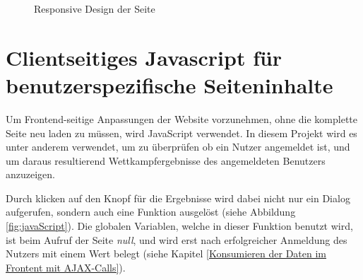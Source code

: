 \begin{figure}[!h]
	\caption{Responsive Design der Seite}
	\label{fig:responsive}
\end{figure}

\section{Clientseitiges Javascript für benutzerspezifische Seiteninhalte}
\label{Clientseitiges Javascript}
Um Frontend-seitige Anpassungen der Website vorzunehmen, ohne die komplette Seite neu laden zu müssen, wird JavaScript verwendet. In diesem Projekt wird es unter anderem verwendet, um zu überprüfen ob ein Nutzer angemeldet ist, und um daraus resultierend Wettkampfergebnisse des angemeldeten Benutzers anzuzeigen.
\par
Durch klicken auf den Knopf für die Ergebnisse wird dabei nicht nur ein Dialog aufgerufen, sondern auch eine Funktion ausgelöst (siehe Abbildung \vref{fig:javaScript}). Die globalen Variablen, welche in dieser Funktion benutzt wird, ist beim Aufruf der Seite \textit{null}, und wird erst nach erfolgreicher Anmeldung des Nutzers mit einem Wert belegt (siehe Kapitel \vref{Konsumieren der Daten im Frontent mit AJAX-Calls}).

